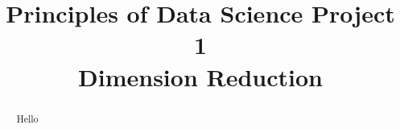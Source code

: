 \documentclass{article}
\title{Principles of Data Science Project 1\\
        Dimension Reduction}
\author{}
\begin{document}
\maketitle

\begin{abstract}
	Hello
\end{abstract}
\end{document}
